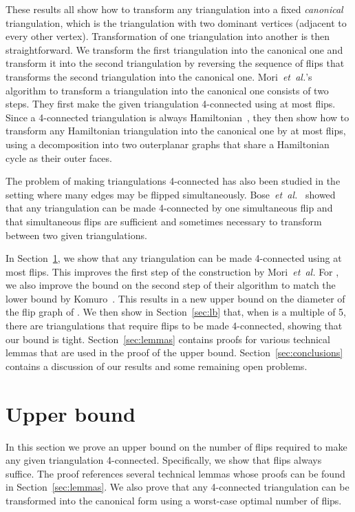 \pdfoutput=1 \documentclass[12pt]{elsarticle}
\newcommand{\etal}{\emph{et~al.}\xspace}
\begin{document}
These results all show how to transform any triangulation into a fixed \emph{canonical} triangulation, which is the  triangulation with two dominant vertices (adjacent to every other vertex). Transformation of one triangulation into another is then straightforward. We transform the first triangulation into the canonical one and transform it into the second triangulation by reversing the sequence of flips that transforms the second triangulation into the canonical one. Mori~\etal's algorithm to transform a triangulation into the canonical one consists of two steps. They first make the given triangulation 4-connected using at most  flips. Since a 4-connected triangulation is always Hamiltonian~\cite{whitney1931theorem}, they then show how to transform any Hamiltonian triangulation into the canonical one by at most  flips, using a decomposition into two outerplanar graphs that share a Hamiltonian cycle as their outer faces.

The problem of making triangulations 4-connected has also been studied in the setting where many edges may be flipped simultaneously. Bose~\etal~\cite{bose2006simultaneous} showed that any triangulation can be made 4-connected by one simultaneous flip and that  simultaneous flips are sufficient and sometimes necessary to transform between two given triangulations.

In Section~\ref{sec:ub}, we show that any triangulation can be made 4-connected using at most  flips. This improves the first step of the construction by Mori~\etal For , we also improve the bound on the second step of their algorithm to match the lower bound by Komuro~\cite{komuro1997diagonal}. This results in a new upper bound on the diameter of the flip graph of . We then show in Section~\ref{sec:lb} that, when  is a multiple of 5, there are triangulations that require  flips to be made 4-connected, showing that our bound is tight. Section~\ref{sec:lemmas} contains proofs for various technical lemmas that are used in the proof of the upper bound. Section~\ref{sec:conclusions} contains a discussion of our results and some remaining open problems.

\section{Upper bound}
\label{sec:ub}

\noindent In this section we prove an upper bound on the number of flips required to make any given triangulation 4-connected. Specifically, we show that \mbox{} flips always suffice. The proof references several technical lemmas whose proofs can be found in Section~\ref{sec:lemmas}. We also prove that any 4-connected triangulation can be transformed into the canonical form using a worst-case optimal number of  flips.
\end{document}
